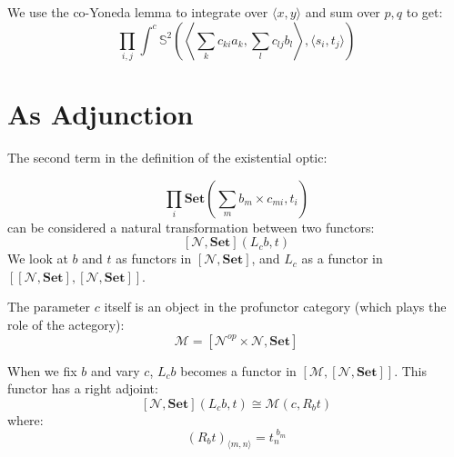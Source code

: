 \documentclass[11pt]{amsart}
\begin{document}
We use the co-Yoneda lemma to integrate over $\langle x, y \rangle$ and sum over $p, q$ to get:
\[ \prod_{i, j} \int^c \mathbb{S}^2  \left(\left \langle 
      \sum_k c_{k i}  a_k
    , \sum_l c_{l j} b_l \right \rangle,  
        \langle s_i, t_j \rangle \right) \]
        
\section{As Adjunction}

The second term in the definition of the existential optic:

\[ \prod_i  \mathbf{Set} \left(\sum_m b_m \times c_{m i}, t_i \right) \]
can be considered a natural transformation between two functors:
\[ [\mathcal{N}, \mathbf{Set}](L_c b, t) \]
We look at $b$ and $t$ as functors in $[\mathcal{N}, \mathbf{Set}]$, and $L_c$ as a functor in $[[\mathcal{N}, \mathbf{Set}], [\mathcal{N}, \mathbf{Set}]]$. 

The parameter $c$ itself is an object in the profunctor category (which plays the role of the actegory):
\[ \mathcal{M} = [\mathcal{N}^{op} \times \mathcal{N}, \mathbf{Set}] \]

When we fix $b$ and vary $c$, $L_c b$ becomes a functor  in $[\mathcal{M},  [\mathcal{N}, \mathbf{Set}]]$. This functor has a right adjoint:
\[ [\mathcal{N}, \mathbf{Set}](L_c b, t) \cong \mathcal{M}(c, R_b t)\]
where:
\[(R_b t)_{\langle m, n \rangle} =  t_n^{\;b_{m}} \]
\end{document}
